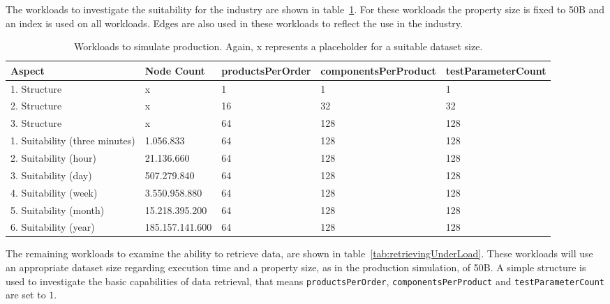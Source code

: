The workloads to investigate the suitability for the industry are shown in table~\ref{tab:productionSimulation}.
For these workloads the property size is fixed to 50B and an index is used on all workloads.
Edges are also used in these workloads to reflect the use in the industry.

\begin{table}[!h]
  \begin{minipage}{\textwidth}
    \begin{tabularx}{\textwidth}{ | X | X | X | X | X | }
      \hline
      Aspect & Node Count & products\-Per\-Order & components\-Per\-Product & test\-Parameter\-Count \\ \hline
      1. Structure & x & 1 & 1 & 1 \\ \hline
      2. Structure & x & 16 & 32 & 32 \\ \hline
      3. Structure & x & 64 & 128 & 128 \\ \hline
      1. Suitability (three minutes) & 1.056.833 & 64 & 128 & 128 \\ \hline
      2. Suitability (hour) & 21.136.660 & 64 & 128 & 128 \\ \hline
      3. Suitability (day) & 507.279.840 & 64 & 128 & 128 \\ \hline
      4. Suitability (week) & 3.550.958.880 & 64 & 128 & 128 \\ \hline
      5. Suitability (month) & 15.218.395.200 & 64 & 128 & 128 \\ \hline
      6. Suitability (year) & 185.157.141.600 & 64 & 128 & 128 \\ \hline
    \end{tabularx}
  \end{minipage}
  \caption{Workloads to simulate production. Again, x represents a placeholder for a suitable dataset size.}
  \label{tab:productionSimulation}
\end{table}

The remaining workloads to examine the ability to retrieve data,
are shown in table~\ref{tab:retrievingUnderLoad}.
These workloads will use an appropriate dataset size regarding execution time and a property size,
as in the production simulation,
of 50B.
A simple structure is used to investigate the basic capabilities of data retrieval,
that means \texttt{productsPerOrder},
\texttt{componentsPerProduct} and \texttt{testParameterCount} are set to $ 1 $.

